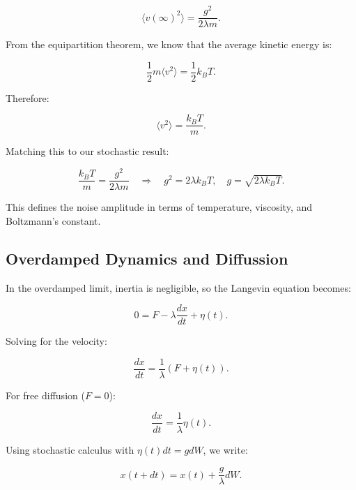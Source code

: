 \begin{equation}
  \langle v(\infty)^2 \rangle = \frac{g^2}{2 \lambda m} \text{.}
\end{equation}

From the equipartition theorem, we know that the average kinetic energy is:

\[
  \frac{1}{2} m \langle v^2 \rangle = \frac{1}{2} k_B T \text{.}
\]

Therefore:

\begin{equation}
  \langle v^2 \rangle = \frac{k_B T}{m} \text{.}
\end{equation}

Matching this to our stochastic result:

\begin{equation}
  \frac{k_B T}{m} = \frac{g^2}{2 \lambda m} \quad \Rightarrow \quad g^2 = 2 \lambda k_B T, \quad g = \sqrt{2 \lambda k_B T} \text{.}
\end{equation}

This defines the noise amplitude in terms of temperature, viscosity, and Boltzmann’s constant.

\subsection{Overdamped Dynamics and Diffussion}

In the overdamped limit, inertia is negligible, so the Langevin equation becomes:

\begin{equation}
  0 = F - \lambda \frac{dx}{dt} + \eta(t) \text{.}
\end{equation}

Solving for the velocity:

\begin{equation}
  \frac{dx}{dt} = \frac{1}{\lambda} (F + \eta(t)) \text{.}
\end{equation}

For free diffusion (\( F = 0 \)):

\begin{equation}
  \frac{dx}{dt} = \frac{1}{\lambda} \eta(t) \text{.}
\end{equation}

Using stochastic calculus with \( \eta(t) dt = g dW \), we write:

\begin{equation}
  x(t + dt) = x(t) + \frac{g}{\lambda} dW \text{.}
\end{equation}

